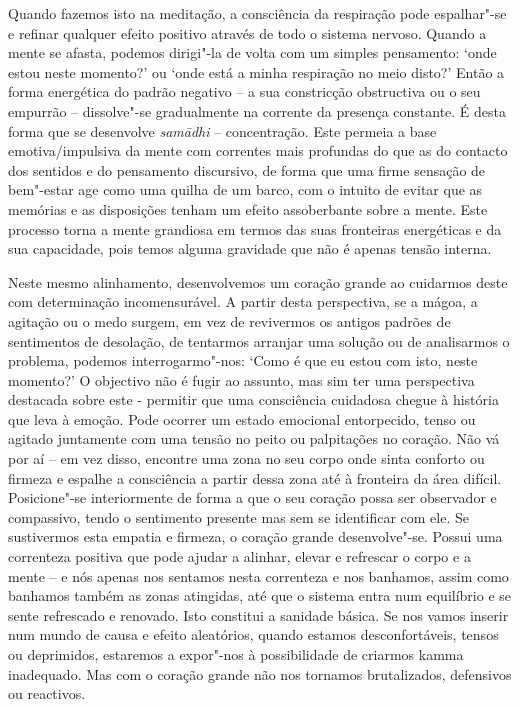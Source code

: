 Quando fazemos isto na meditação, a consciência da respiração pode espalhar"-se e
refinar qualquer efeito positivo através de todo o sistema nervoso. Quando a
mente se afasta, podemos dirigi"-la de volta com um simples pensamento: `onde
estou neste momento?' ou `onde está a minha respiração no meio disto?' Então a
forma energética do padrão negativo -- a sua constricção obstructiva ou o seu
empurrão -- dissolve"-se gradualmente na corrente da presença constante. É desta
forma que se desenvolve \emph{samādhi} -- concentração. Este permeia a base
emotiva/impulsiva da mente com correntes mais profundas do que as do contacto
dos sentidos e do pensamento discursivo, de forma que uma firme sensação de
bem"-estar age como uma quilha de um barco, com o intuito de evitar que as
memórias e as disposições tenham um efeito assoberbante sobre a mente. Este
processo torna a mente grandiosa em termos das suas fronteiras energéticas e da
sua capacidade, pois temos alguma gravidade que não é apenas tensão interna.

Neste mesmo alinhamento, desenvolvemos um coração grande ao cuidarmos deste com
determinação incomensurável. A partir desta perspectiva, se a mágoa, a agitação
ou o medo surgem, em vez de revivermos os antigos padrões de sentimentos de
desolação, de tentarmos arranjar uma solução ou de analisarmos o problema,
podemos interrogarmo"-nos: `Como é que eu estou com isto, neste momento?' O
objectivo não é fugir ao assunto, mas sim ter uma perspectiva destacada sobre
este - permitir que uma consciência cuidadosa chegue à história que leva à
emoção. Pode ocorrer um estado emocional entorpecido, tenso ou agitado
juntamente com uma tensão no peito ou palpitações no coração. Não vá por aí --
em vez disso, encontre uma zona no seu corpo onde sinta conforto ou firmeza e
espalhe a consciência a partir dessa zona até à fronteira da área difícil.
Posicione"-se interiormente de forma a que o seu coração possa ser observador e
compassivo, tendo o sentimento presente mas sem se identificar com ele. Se
sustivermos esta empatia e firmeza, o coração grande desenvolve"-se. Possui uma
correnteza positiva que pode ajudar a alinhar, elevar e refrescar o corpo e a
mente -- e nós apenas nos sentamos nesta correnteza e nos banhamos, assim como
banhamos também as zonas atingidas, até que o sistema entra num equilíbrio e se
sente refrescado e renovado. Isto constitui a sanidade básica. Se nos vamos
inserir num mundo de causa e efeito aleatórios, quando estamos desconfortáveis,
tensos ou deprimidos, estaremos a expor"-nos à possibilidade de criarmos kamma
inadequado. Mas com o coração grande não nos tornamos brutalizados, defensivos
ou reactivos.

